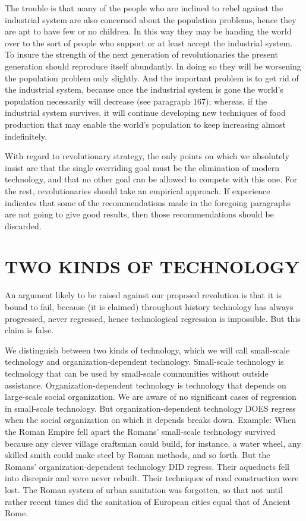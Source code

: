  The trouble is that many of the people who are inclined to rebel against the industrial system are also concerned about the population problems, hence they are apt to have few or no children. In this way they may be handing the world over to the sort of people who support or at least accept the industrial system. To insure the strength of the next generation of revolutionaries the present generation should reproduce itself abundantly. In doing so they will be worsening the population problem only slightly. And the important problem is to get rid of the industrial system, because once the industrial system is gone the world’s population necessarily will decrease (see paragraph 167); whereas, if the industrial system survives, it will continue developing new techniques of food production that may enable the world’s population to keep increasing almost indefinitely.

 With regard to revolutionary strategy, the only points on which we absolutely insist are that the single overriding goal must be the elimination of modern technology, and that no other goal can be allowed to compete with this one. For the rest, revolutionaries should take an empirical approach. If experience indicates that some of the recommendations made in the foregoing paragraphs are not going to give good results, then those recommendations should be discarded.

\chapter{TWO KINDS OF TECHNOLOGY}

 An argument likely to be raised against our proposed revolution is that it is bound to fail, because (it is claimed) throughout history technology has always progressed, never regressed, hence technological regression is impossible. But this claim is false.

 We distinguish between two kinds of technology, which we will call small-scale technology and organization-dependent technology. Small-scale technology is technology that can be used by small-scale communities without outside assistance. Organization-dependent technology is technology that depends on large-scale social organization. We are aware of no significant cases of regression in small-scale technology. But organization-dependent technology DOES regress when the social organization on which it depends breaks down. Example: When the Roman Empire fell apart the Romans’ small-scale technology survived because any clever village craftsman could build, for instance, a water wheel, any skilled smith could make steel by Roman methods, and so forth. But the Romans’ organization-dependent technology DID regress. Their aqueducts fell into disrepair and were never rebuilt. Their techniques of road construction were lost. The Roman system of urban sanitation was forgotten, so that not until rather recent times did the sanitation of European cities equal that of Ancient Rome.

